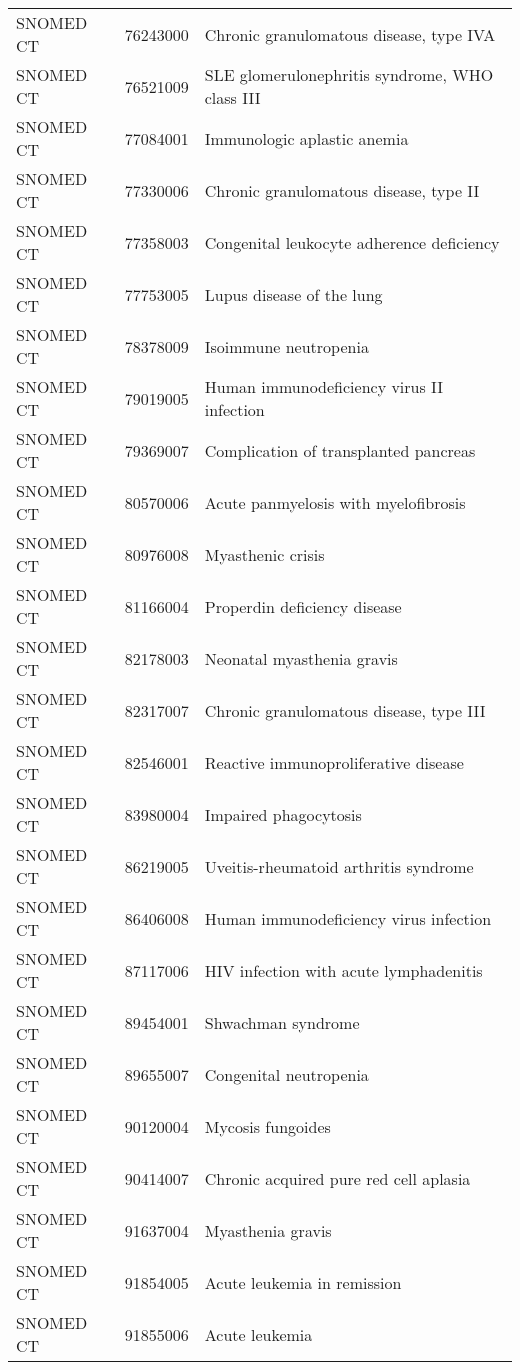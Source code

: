 \begin{table}[ht]
\begin{tabular}{lll}
  SNOMED CT & 76243000 & Chronic granulomatous disease, type IVA \\ 
  SNOMED CT & 76521009 & SLE glomerulonephritis syndrome, WHO class III \\ 
  SNOMED CT & 77084001 & Immunologic aplastic anemia \\ 
  SNOMED CT & 77330006 & Chronic granulomatous disease, type II \\ 
  SNOMED CT & 77358003 & Congenital leukocyte adherence deficiency \\ 
  SNOMED CT & 77753005 & Lupus disease of the lung \\ 
  SNOMED CT & 78378009 & Isoimmune neutropenia \\ 
  SNOMED CT & 79019005 & Human immunodeficiency virus II infection \\ 
  SNOMED CT & 79369007 & Complication of transplanted pancreas \\ 
  SNOMED CT & 80570006 & Acute panmyelosis with myelofibrosis \\ 
  SNOMED CT & 80976008 & Myasthenic crisis \\ 
  SNOMED CT & 81166004 & Properdin deficiency disease \\ 
  SNOMED CT & 82178003 & Neonatal myasthenia gravis \\ 
  SNOMED CT & 82317007 & Chronic granulomatous disease, type III \\ 
  SNOMED CT & 82546001 & Reactive immunoproliferative disease \\ 
  SNOMED CT & 83980004 & Impaired phagocytosis \\ 
  SNOMED CT & 86219005 & Uveitis-rheumatoid arthritis syndrome \\ 
  SNOMED CT & 86406008 & Human immunodeficiency virus infection \\ 
  SNOMED CT & 87117006 & HIV infection with acute lymphadenitis \\ 
  SNOMED CT & 89454001 & Shwachman syndrome \\ 
  SNOMED CT & 89655007 & Congenital neutropenia \\ 
  SNOMED CT & 90120004 & Mycosis fungoides \\ 
  SNOMED CT & 90414007 & Chronic acquired pure red cell aplasia \\ 
  SNOMED CT & 91637004 & Myasthenia gravis \\ 
  SNOMED CT & 91854005 & Acute leukemia in remission \\ 
  SNOMED CT & 91855006 & Acute leukemia \\ 

\end{tabular}
\end{table}
